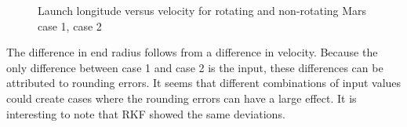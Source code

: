 \begin{figure}[H]
\centering
{} 
\caption{Launch longitude versus velocity for rotating and non-rotating Mars \protect{} case 1,  \protect{} case 2 } 
\label{fig:launchLongitudeVsVelocityCase1combined} 
\end{figure}

\noindent
The difference in end radius follows from a difference in velocity. Because the only difference between case 1 and case 2 is the input, these differences can be attributed to rounding errors.  It seems that different combinations of input values could create cases where the rounding errors can have a large effect. It is interesting to note that \ac{RKF} showed the same deviations.


